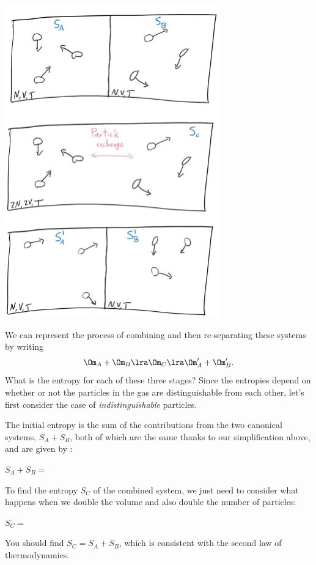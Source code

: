 \begin{center}
  \includegraphics[width=0.7\textwidth]{figs/unit04_mixing.pdf}
\end{center}

We can represent the process of combining and then re-separating these systems by writing
\begin{equation*}
  \Om_A + \Om_B \lra \Om_C \lra \Om_A' + \Om_B'.
\end{equation*}
What is the entropy for each of these three stages?
Since the entropies depend on whether or not the particles in the gas are distinguishable from each other, let's first consider the case of \textit{indistinguishable} particles.

\newpage %
The initial entropy is the sum of the contributions from the two canonical systems, $S_A + S_B$, both of which are the same thanks to our simplification above, and are given by :
\begin{mdframed}
  $\displaystyle S_A + S_B = $ \\[50 pt]
\end{mdframed}
To find the entropy $S_C$ of the combined system, we just need to consider what happens when we double the volume and also double the number of particles:
\begin{mdframed}
  $\displaystyle S_C = $ \\[50 pt]
\end{mdframed}
You should find $S_C = S_A + S_B$, which is consistent with the second law of thermodynamics.


